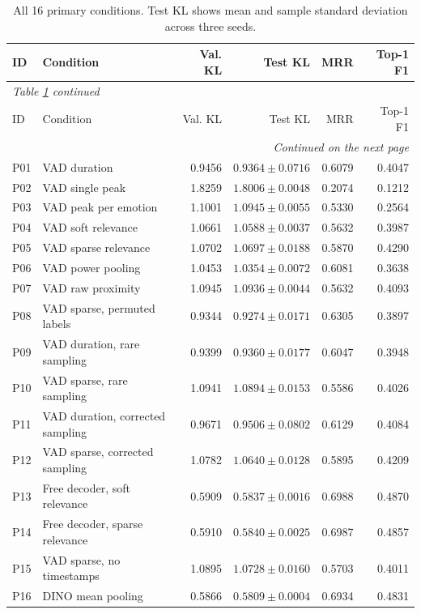 \begingroup
\small
\setlength{\tabcolsep}{4pt}
\begin{longtable}{lp{5.6cm}rrrr}
\caption{All 16 primary conditions. Test KL shows mean and sample standard deviation across three seeds.}\label{tab:primary}\\
\toprule
ID & Condition & Val. KL & Test KL & MRR & Top-1 F1 \\
\midrule\endfirsthead
\multicolumn{6}{l}{\textit{Table \ref{tab:primary} continued}}\\
\toprule
ID & Condition & Val. KL & Test KL & MRR & Top-1 F1 \\
\midrule\endhead
\midrule\multicolumn{6}{r}{\textit{Continued on the next page}}\\\endfoot
\bottomrule\endlastfoot
P01 & VAD duration & 0.9456 & $0.9364 \pm 0.0716$ & 0.6079 & 0.4047 \\
P02 & VAD single peak & 1.8259 & $1.8006 \pm 0.0048$ & 0.2074 & 0.1212 \\
P03 & VAD peak per emotion & 1.1001 & $1.0945 \pm 0.0055$ & 0.5330 & 0.2564 \\
P04 & VAD soft relevance & 1.0661 & $1.0588 \pm 0.0037$ & 0.5632 & 0.3987 \\
P05 & VAD sparse relevance & 1.0702 & $1.0697 \pm 0.0188$ & 0.5870 & 0.4290 \\
P06 & VAD power pooling & 1.0453 & $1.0354 \pm 0.0072$ & 0.6081 & 0.3638 \\
P07 & VAD raw proximity & 1.0945 & $1.0936 \pm 0.0044$ & 0.5632 & 0.4093 \\
P08 & VAD sparse, permuted labels & 0.9344 & $0.9274 \pm 0.0171$ & 0.6305 & 0.3897 \\
P09 & VAD duration, rare sampling & 0.9399 & $0.9360 \pm 0.0177$ & 0.6047 & 0.3948 \\
P10 & VAD sparse, rare sampling & 1.0941 & $1.0894 \pm 0.0153$ & 0.5586 & 0.4026 \\
P11 & VAD duration, corrected sampling & 0.9671 & $0.9506 \pm 0.0802$ & 0.6129 & 0.4084 \\
P12 & VAD sparse, corrected sampling & 1.0782 & $1.0640 \pm 0.0128$ & 0.5895 & 0.4209 \\
P13 & Free decoder, soft relevance & 0.5909 & $0.5837 \pm 0.0016$ & 0.6988 & 0.4870 \\
P14 & Free decoder, sparse relevance & 0.5910 & $0.5840 \pm 0.0025$ & 0.6987 & 0.4857 \\
P15 & VAD sparse, no timestamps & 1.0895 & $1.0728 \pm 0.0160$ & 0.5703 & 0.4011 \\
P16 & DINO mean pooling & 0.5866 & $0.5809 \pm 0.0004$ & 0.6934 & 0.4831 \\
\end{longtable}
\endgroup
